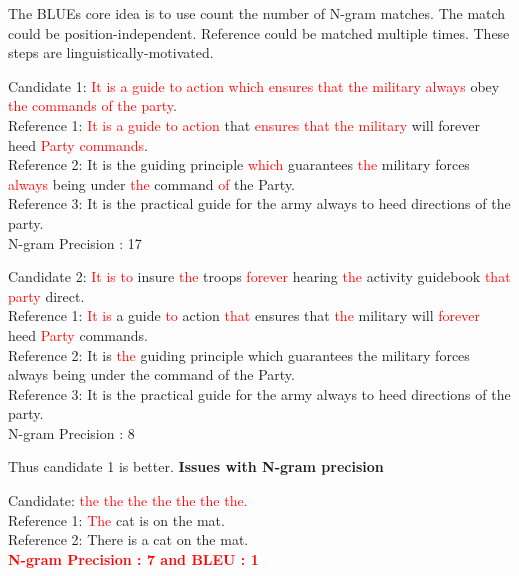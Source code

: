 \documentclass[conference]{IEEEtran}
\begin{document}
The BLUEs core idea is to use  count the number of N-gram matches. The match could be position-independent. Reference could be matched multiple times. These steps are linguistically-motivated.





Candidate 1: \textcolor{red} {It is a guide to action which ensures that the military always} obey  \textcolor{red} {the commands of the party}.
\\
Reference 1: \textcolor{red} {It is a guide to action} that \textcolor{red} {ensures that the military} will forever heed \textcolor{red} {Party commands}. 
\\
Reference 2: It is the guiding principle \textcolor{red} {which} guarantees \textcolor{red} {the} military forces \textcolor{red} {always} being under \textcolor{red} {the} command \textcolor{red} {of} the Party.
\\
Reference 3: It is the practical guide for the army always to heed directions of the party.
\\
N-gram Precision : 17


Candidate 2: \textcolor{red} {It is to} insure \textcolor{red} {the} troops \textcolor{red} {forever} hearing \textcolor{red} {the} activity guidebook \textcolor{red} {that party} direct. 
\\
Reference 1: \textcolor{red} {It is} a guide \textcolor{red} {to} action \textcolor{red} {that} ensures that \textcolor{red} {the} military will \textcolor{red} {forever} heed \textcolor{red} {Party} commands. 
\\
Reference 2: It is \textcolor{red} {the} guiding principle which guarantees the military forces always being under the command of the Party.
\\
Reference 3: It is the practical guide for the army always to heed directions of the party.
\\
N-gram Precision : 8


Thus candidate 1 is better.
\textbf{Issues with N-gram precision}


Candidate: \textcolor{red} {the the the the the the the.} \\
Reference 1: \textcolor{red} {The} cat is on the mat. \\
Reference 2: There is a cat on the mat.\\

\textbf{ \textcolor{red}{N-gram Precision : 7 and BLEU : 1}}
\end{document}

